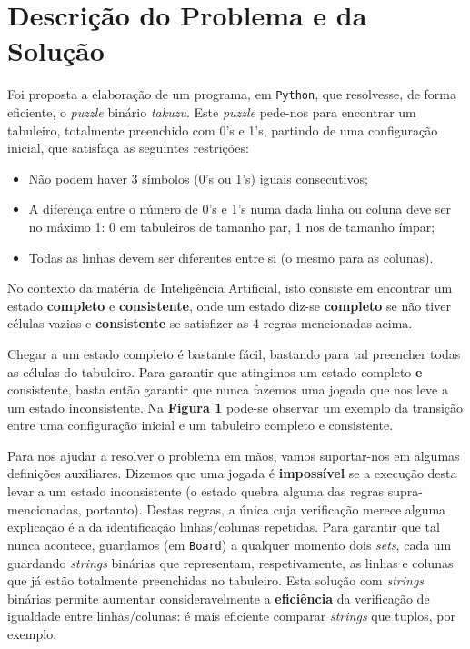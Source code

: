 \documentclass[12pt,a4paper]{article}
\begin{document}
\section*{Descrição do Problema e da Solução}

Foi proposta a elaboração de um programa, em \texttt{Python}, que resolvesse, de forma eficiente, o \textit{puzzle} binário \textit{takuzu}.
Este \textit{puzzle} pede-nos para encontrar um tabuleiro, totalmente preenchido com 0's e 1's, partindo de uma configuração inicial, que satisfaça as seguintes restrições:
\begin{itemize}
  \item Não podem haver 3 símbolos (0's ou 1's) iguais consecutivos;
  \item A diferença entre o número de 0's e 1's numa dada linha ou coluna deve ser no máximo 1: 0 em tabuleiros de tamanho par, 1 nos de tamanho ímpar;
  \item Todas as linhas devem ser diferentes entre si (o mesmo para as colunas).
\end{itemize}

No contexto da matéria de Inteligência Artificial, isto consiste em encontrar um estado \textbf{completo} e \textbf{consistente}, onde um estado diz-se \textbf{completo} se não tiver células vazias e \textbf{consistente} se satisfizer as 4 regras mencionadas acima.

Chegar a um estado completo é bastante fácil, bastando para tal preencher todas as células do tabuleiro.
Para garantir que atingimos um estado completo \textbf{e} consistente, basta então garantir que nunca fazemos uma jogada que nos leve a um estado inconsistente.
Na \textbf{Figura 1} pode-se observar um exemplo da transição entre uma configuração inicial e um tabuleiro completo e consistente.

Para nos ajudar a resolver o problema em mãos, vamos suportar-nos em algumas definições auxiliares.
Dizemos que uma jogada é \textbf{impossível} se a execução desta levar a um estado inconsistente (o estado quebra alguma das regras supra-mencionadas, portanto).
Destas regras, a única cuja verificação merece alguma explicação é a da identificação linhas/colunas repetidas.
Para garantir que tal nunca acontece, guardamos (em \texttt{Board}) a qualquer momento dois \textit{sets}, cada um guardando \textit{strings} binárias que representam, respetivamente, as linhas e colunas que já estão totalmente preenchidas no tabuleiro.
Esta solução com \textit{strings} binárias permite aumentar consideravelmente a \textbf{eficiência} da verificação de igualdade entre linhas/colunas: é mais eficiente comparar \textit{strings} que tuplos, por exemplo.
\end{document}
